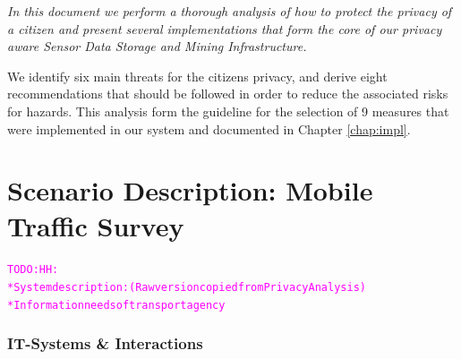\documentclass[runningheads,a4paper]{llncs}
\newcommand{\TODO}[1]{\begin{alltt}\textcolor{magenta}{TODO: #1}\end{alltt}}
\newenvironment{LGContent}
{ \par\color{blue} \it \small }
{ \par }
\begin{document}
\begin{LGContent}
In this document we perform a thorough analysis of how to protect the
privacy of a citizen and present several implementations that form the
core of our privacy aware Sensor Data Storage and Mining Infrastructure.

We identify six main threats for the citizens privacy, and derive
eight recommendations that should be followed in order to reduce the
associated risks for hazards.  This analysis form the guideline for
the selection of 9 measures that were implemented in our system and
documented in Chapter \ref{chap:impl}.
\end{LGContent}


\section{Scenario Description: Mobile Traffic Survey}

\TODO{HH:\\
* System description: (Raw version copied from Privacy Analysis)\\
* Information needs of transport agency\\
}

\subsubsection{IT-Systems \& Interactions}
\label{subsubsection:it-systems}
\end{document}
